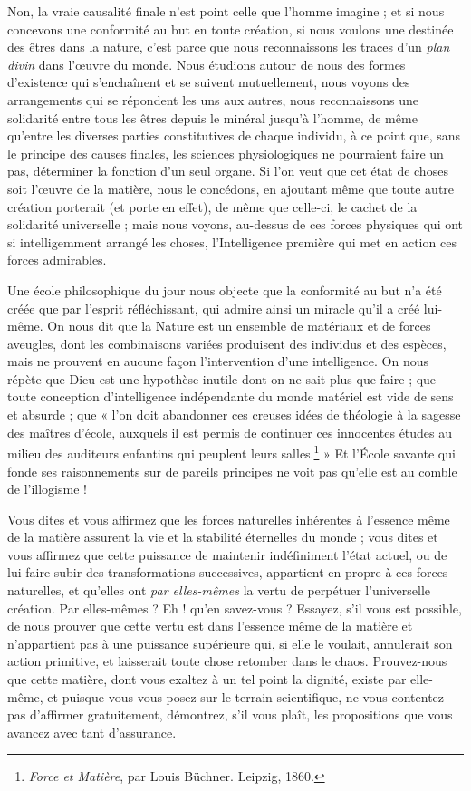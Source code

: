 \documentclass[a4paper, 11pt, oneside]{article}
\begin{document}
Non, la vraie causalité finale n'est point celle que l'homme imagine ; et si nous concevons une conformité au but en toute création, si nous voulons une destinée des êtres dans la nature, c'est parce que nous reconnaissons les traces d'un \emph{plan divin} dans l'œuvre du monde. Nous étudions autour de nous des formes d'existence qui s'enchaînent et se suivent mutuellement, nous voyons des arrangements qui se répondent les uns aux autres, nous reconnaissons une solidarité entre tous les êtres depuis le minéral jusqu'à l'homme, de même qu'entre les diverses parties constitutives de chaque individu, à ce point que, sans le principe des causes finales, les sciences physiologiques ne pourraient faire un pas, déterminer la fonction d'un seul organe. Si l'on veut que cet état de choses soit l'œuvre de la matière, nous le concédons, en ajoutant même que toute autre création porterait (et porte en effet), de même que celle-ci, le cachet de la solidarité universelle ; mais nous voyons, au-dessus de ces forces physiques qui ont si intelligemment arrangé les choses, l'Intelligence première qui met en action ces forces admirables.

Une école philosophique du jour nous objecte que la conformité au but n'a été créée que par l'esprit réfléchissant, qui admire ainsi un miracle qu'il a créé lui-même. On nous dit que la Nature est un ensemble de matériaux et de forces aveugles, dont les combinaisons variées produisent des individus et des espèces, mais ne prouvent en aucune façon l'intervention d'une intelligence. On nous répète que Dieu est une hypothèse inutile dont on ne sait plus que faire ; que toute conception d'intelligence indépendante du monde matériel est vide de sens et absurde ; que « l'on doit abandonner ces creuses idées de théologie à la sagesse des maîtres d'école, auxquels il est permis de continuer ces innocentes études au milieu des auditeurs enfantins qui peuplent leurs salles.\footnote{\emph{Force et Matière}, par Louis Büchner. Leipzig, 1860.} » Et l'École savante qui fonde ses raisonnements sur de pareils principes ne voit pas qu'elle est au comble de l'illogisme !

Vous dites et vous affirmez que les forces naturelles inhérentes à l'essence même de la matière assurent la vie et la stabilité éternelles du monde ; vous dites et vous affirmez que cette puissance de maintenir indéfiniment l'état actuel, ou de lui faire subir des transformations successives, appartient en propre à ces forces naturelles, et qu'elles ont \emph{par elles-mêmes} la vertu de perpétuer l'universelle création. Par elles-mêmes ? Eh ! qu'en savez-vous ? Essayez, s'il vous est possible, de nous prouver que cette vertu est dans l'essence même de la matière et n'appartient pas à une puissance supérieure qui, si elle le voulait, annulerait son action primitive, et laisserait toute chose retomber dans le chaos. Prouvez-nous que cette matière, dont vous exaltez à un tel point la dignité, existe par elle-même, et puisque vous vous posez sur le terrain scientifique, ne vous contentez pas d'affirmer gratuitement, démontrez, s'il vous plaît, les propositions que vous avancez avec tant d'assurance.
\end{document}
